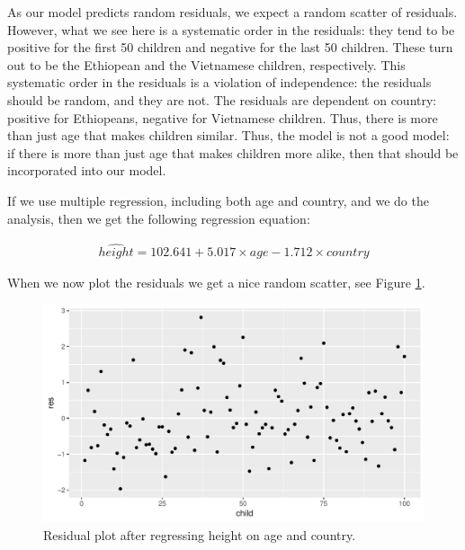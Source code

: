 \documentclass[]{report}\usepackage[]{graphicx}\usepackage[]{color}
\makeatletter
\def\maxwidth{ %
  \ifdim\Gin@nat@width>\linewidth
    \linewidth
  \else
    \Gin@nat@width
  \fi
}
\newenvironment{knitrout}{}{} %
\makeatother
\begin{document}
As our model predicts random residuals, we expect a random scatter of residuals. However, what we see here is a systematic order in the residuals: they tend to be positive for the first 50 children and negative for the last 50 children. These turn out to be the Ethiopean and the Vietnamese children, respectively. This systematic order in the residuals is a violation of independence: the residuals should be random, and they are not. The residuals are dependent on country: positive for Ethiopeans, negative for Vietnamese children. Thus, there is more than just age that makes children similar. Thus, the model is not a good model: if there is more than just age that makes children more alike, then that should be incorporated into our model. 

If we use multiple regression, including both age and country, and we do the analysis, then we get the following regression equation:



\begin{eqnarray}
\widehat{height} = 102.641 + 5.017 \times age - 1.712 \times country 
\end{eqnarray}

When we now plot the residuals we get a nice random scatter, see Figure \ref{fig:ass_7}.

\begin{knitrout}
\color{fgcolor}\begin{figure}

{\centering \includegraphics[width=\maxwidth]{figure/ass_7-1} 

}

\caption[Residual plot after regressing height on age and country]{Residual plot after regressing height on age and country.}\label{fig:ass_7}
\end{figure}


\end{knitrout}
\end{document}

